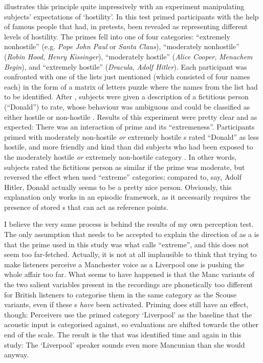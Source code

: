 \citeauthor{herr1986} illustrates this principle quite impressively with an experiment manipulating subjects' expectations of `hostility'.
In this test \citeauthor{herr1986} primed participants with the help of famous people that had, in pretests, been revealed as representing different levels of hostility.
The primes fell into one of four categories: ``extremely nonhostile'' (e.g. \emph{Pope John Paul} or \emph{Santa Claus}), ``moderately nonhostile'' (\emph{Robin Hood}, \emph{Henry Kissinger}), ``moderately hostile'' (\emph{Alice Cooper}, \emph{Menachem Begin}), and ``extremely hostile'' (\emph{Dracula}, \emph{Adolf Hitler}).
Each participant was confronted with one of the lists just mentioned (which consisted of four names each) in the form of a matrix of letters puzzle where the names from the list had to be identified.
After , subjects were given a description of a fictitious person (``Donald'') to rate, whose behaviour was ambiguous and could be classified as either hostile or non-hostile \parencite[cf.][1108]{herr1986}.
Results of this experiment were pretty clear and as expected: There was an interaction of prime and its ``extremeness''.
Participants primed with moderately non-hostile \emph{or} extremely hostile s rated ``Donald'' as less hostile, and more friendly and kind than did subjects who had been exposed to the moderately hostile \emph{or} extremely non-hostile category \parencite[cf.][1109]{herr1986}.
In other words, subjects rated the fictitious person as similar if the prime was moderate, but reversed the effect when  used ``extreme'' categories; compared to, say, Adolf Hitler, Donald actually seems to be a pretty nice person.
Obviously, this explanation only works in an episodic framework, as it necessarily requires the presence of stored s that can act as reference points.

I believe the very same process is behind the results of my own perception test.
The only assumption that needs to be accepted to explain the direction of  as a  is that the prime used in this study was what \citeauthor{herr1986} calls ``extreme'', and this does not seem too far-fetched.
Actually, it is not at all implausible to think that trying to make listeners perceive a Manchester voice as a Liverpool one is pushing the whole affair too far.
What seems to have happened is that the Manc variants of the two salient variables present in the recordings are phonetically too different for British listeners to categorise them in the same category as the Scouse variants, even if these s \emph{have} been activated.
Priming does still have an effect, though: Perceivers use the primed category `Liverpool' as the baseline that the acoustic input is categorised against, so evaluations are shifted towards the other end of the scale.
The result is the  that was identified time and again in this study: The `Liverpool' speaker sounds even more Mancunian than she would anyway.


